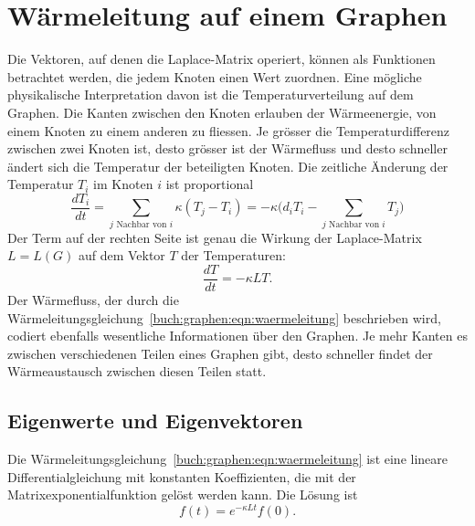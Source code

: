 %
%
%
\section{Wärmeleitung auf einem Graphen
\label{buch:section:waermeleitung-auf-einem-graphen}}
Die Vektoren, auf denen die Laplace-Matrix operiert, können
als Funktionen betrachtet werden, die jedem Knoten einen Wert zuordnen.
Eine mögliche physikalische Interpretation davon ist die Temperaturverteilung
auf dem Graphen.
%
Die Kanten zwischen den Knoten erlauben der Wärmeenergie, von einem Knoten
zu einem anderen zu fliessen.
Je grösser die Temperaturdifferenz zwischen zwei Knoten ist, desto
grösser ist der Wärmefluss und desto schneller ändert sich die Temperatur
der beteiligten Knoten.
Die zeitliche Änderung der Temperatur $T_i$ im Knoten $i$ ist proportional
\[
\frac{dT_i}{dt}
=
\sum_{\text{$j$ Nachbar von $i$}} \kappa (T_j-T_i)
=
-
\kappa
\biggl(
d_iT_i
-
\sum_{\text{$j$ Nachbar von $i$}} T_j
\biggr)
\]
Der Term auf der rechten Seite ist genau die Wirkung der 
Laplace-Matrix $L=L(G)$ auf dem Vektor $T$ der Temperaturen:
\begin{equation}
\frac{dT}{dt}
=
-\kappa L T.
\label{buch:graphen:eqn:waermeleitung}
\end{equation}
Der Wärmefluss, der durch die
Wärmeleitungsgleichung~\eqref{buch:graphen:eqn:waermeleitung} beschrieben
%
wird, codiert ebenfalls wesentliche Informationen über den Graphen.
Je mehr Kanten es zwischen verschiedenen Teilen eines Graphen gibt,
desto schneller findet der Wärmeaustausch zwischen diesen Teilen
statt.

\subsection{Eigenwerte und Eigenvektoren
\label{buch:subsection:ein-zyklischer-graph}}
Die Wärmeleitungsgleichung~\eqref{buch:graphen:eqn:waermeleitung} 
ist eine lineare Differentialgleichung mit konstanten Koeffizienten,
die mit der Matrixexponentialfunktion gelöst werden kann.
%
Die Lösung ist
\[
f(t) = e^{-\kappa Lt}f(0).
\]

